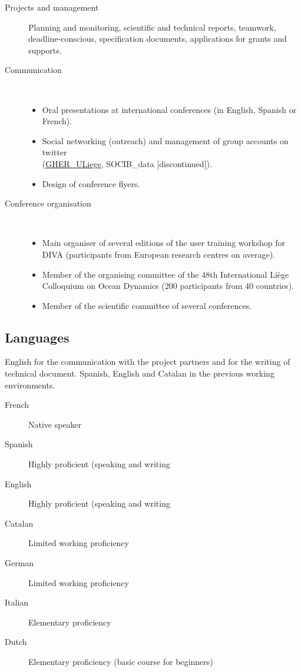 \documentclass[10pt,a4paper,svgnames]{article}
\begin{document}
\begin{description}
\item[Projects and management] {Planning and monitoring, scientific and technical reports, teamwork, deadline-conscious, specification documents, applications for grants and supports.}

\item[Communication]~
\begin{itemize}
\item Oral presentations at international conferences (in English, Spanish or French).
\item Social networking (outreach) and management of group accounts on twitter\\ 
(\href{GHER_ULiege}{GHER\_ULiege}, SOCIB\_data [discontinued]).
\item Design of conference flyers.
\end{itemize}

\item[Conference organisation]~
\begin{itemize}
\item Main organiser of several editions of the user training workshop for DIVA (participants from European research centres on average).
\item Member of the organising committee of the 48th International Li\`{e}ge Colloquium on Ocean Dynamics (200 participants from 40 countries).
\item Member of the scientific committee of several conferences.
\end{itemize}
\end{description}

\subsection{Languages}
\begin{summarybox}
English for the communication with the project partners and for the writing of technical document. Spanish, English and Catalan in the previous working environments.
\end{summarybox}

\begin{description}
\item[French] {Native speaker}
\item[Spanish] {Highly proficient (speaking and writing}
\item[English] {Highly proficient (speaking and writing}
\item[Catalan] {Limited working proficiency}
\item[German] {Limited working proficiency}
\item[Italian] {Elementary proficiency}
\item[Dutch] {Elementary proficiency (basic course for beginners)}
\end{description}
\end{document}
